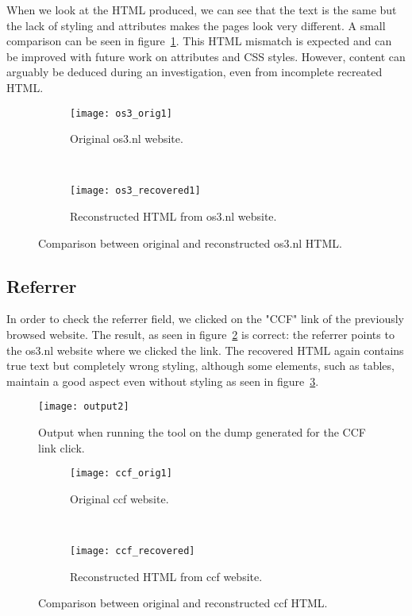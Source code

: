 When we look at the HTML produced, we can see that the text is the
same but the lack of styling and attributes makes the pages look very
different. A small comparison can be seen in
figure~\ref{fig:os3_compare}. This HTML mismatch is expected and can
be improved with future work on attributes and CSS styles. However,
content can arguably be deduced during an investigation, even from
incomplete recreated HTML.

\begin{figure}[h]
  \begin{subfigure}{\linewidth} \centering
    \texttt{[image: os3\_orig1]}
    \caption{Original os3.nl website.}
  \end{subfigure}\\[1ex]

  \begin{subfigure}{\linewidth} \centering
    \texttt{[image: os3\_recovered1]}
    \caption{Reconstructed HTML from os3.nl website.}
  \end{subfigure}
  \caption{Comparison between original and reconstructed os3.nl HTML.}
  \label{fig:os3_compare}
\end{figure}

\subsection{Referrer}
In order to check the referrer field, we clicked on the "CCF" link of
the previously browsed website. The result, as seen in
figure~\ref{img:output2} is correct: the referrer points to the os3.nl
website where we clicked the link. The recovered HTML again contains
true text but completely wrong styling, although some elements, such
as tables, maintain a good aspect even without styling as seen in
figure~\ref{fig:ccf_compare}.

\begin{figure}[h] \centering \texttt{[image: output2]}
  \caption{Output when running the tool on the dump generated for the
    CCF link click.}
  \label{img:output2}
\end{figure}

\begin{figure}[h]
  \begin{subfigure}{\linewidth} \centering
    \texttt{[image: ccf\_orig1]}
    \caption{Original ccf website.}
  \end{subfigure}\\[1ex]

  \begin{subfigure}{\linewidth} \centering
    \texttt{[image: ccf\_recovered]}
    \caption{Reconstructed HTML from ccf website.}
  \end{subfigure}
  \caption{Comparison between original and reconstructed ccf HTML.}
  \label{fig:ccf_compare}
\end{figure}

